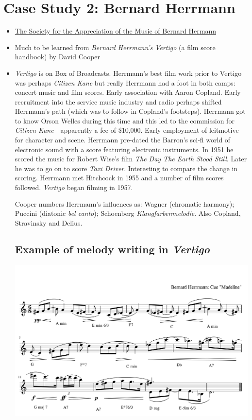 \section{Case Study 2: Bernard Herrmann}
\begin{itemize}
\item \href{http://www.bernardherrmann.org/}
{The Society for the Appreciation of the Music of Bernard Hermann}
\item Much to be learned from \textit{Bernard Herrmann's Vertigo} (a film score handbook) by David Cooper \citep{cooper2001bernard}
\item \textit{Vertigo} is on Box of Broadcasts. 
Herrmann's best film work prior to Vertigo was perhaps \textit{Citizen Kane} but really Herrmann had a foot in both camps: concert music and film scores.  Early association with Aaron Copland. Early recruitment into the service music industry and radio perhaps shifted Herrmann's path (which was to follow in Copland's footsteps). Herrmann got to know Orson Welles during this time and this led to the commission for \textit{Citizen Kane} - apparently a fee of \$10,000. Early employment of leitmotive for character and scene. Herrmann pre-dated the Barron's sci-fi world of electronic sound with a score featuring electronic instruments. In 1951 he scored the music for Robert Wise's film \textit{The Day The Earth Stood Still}. Later he was to go on to score \textit{Taxi Driver}. Interesting to compare the change in scoring. Herrmann met Hitchcock in 1955 and a number of film scores followed. \textit{Vertigo} began filming in 1957.

Cooper \citeyearpar{cooper2001bernard} numbers Herrmann's influences as: Wagner (chromatic harmony); Puccini (diatonic \textit{bel canto}); Schoenberg \textit{Klangfarbenmelodie}. Also Copland, Stravinsky and Delius. 

\subsection{Example of melody writing in \textit{Vertigo}}
\includegraphics[scale=0.8]{herrmann-madeline} 


\end{itemize}
